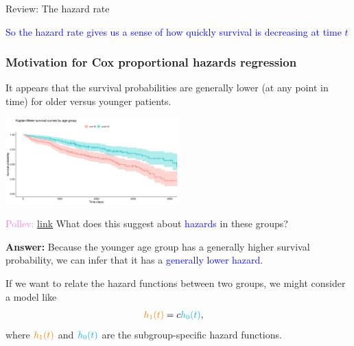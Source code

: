 \documentclass[10pt,t]{beamer}
\begin{document}
\begin{frame}{Review: The hazard rate}
\medskip

\textcolor{blue}{So the hazard rate gives us a sense of how quickly survival is decreasing at time $t$}
	
\end{frame}

\begin{frame}
\frametitle{Motivation for Cox proportional hazards regression}

\vspace{-5 mm}

It appears that the survival probabilities are generally lower (at any point in time) for older versus younger patients. 

\begin{center}
	\includegraphics[width = 0.5\textwidth]{figs/KM_strat_age.png}
\end{center}


\textcolor{violet}{Pollev: \href{https://PollEv.com/multiple_choice_polls/AFKhgXjNggLtFmEj33Lhy/respond}{link}} What does this suggest about \textcolor{blue}{hazards} in these groups?  \pause

\medskip

\textbf{Answer:} Because the younger age group has a generally higher survival probability, we can infer that it has a \textcolor{blue}{generally lower hazard}. 

\bigskip

If we want to relate the hazard functions between two groups, we might consider a model like
\begin{align*}
\textcolor{orange}{h_1(t)} &= c\textcolor{cyan}{h_0(t)},
\end{align*}
where $\textcolor{orange}{h_1(t)}$ and $\textcolor{cyan}{h_0(t)}$ are the subgroup-specific hazard functions.
\end{frame}
\end{document}
